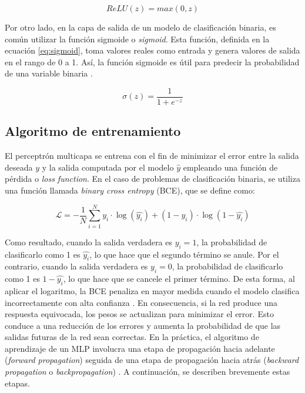 \begin{equation}
	\label{eq:relu}
	ReLU(z) = max(0, z)
\end{equation}

Por otro lado, en la capa de salida de un modelo de clasificación binaria, es común utilizar la función sigmoide o 
\emph{sigmoid}. Esta función, definida en la ecuación \ref{eq:sigmoid}, toma valores reales como entrada y genera 
valores de salida en el rango de 0 a 1. Así, la función sigmoide es útil para predecir la probabilidad de una 
variable binaria \citep{CITE:44}. 

\begin{equation}
	\label{eq:sigmoid}
	\sigma(z) = \frac{1} {1 + e^{-z}}
\end{equation}


\subsection{Algoritmo de entrenamiento}
El perceptrón multicapa se entrena con el fin de minimizar el error entre la salida deseada $y$ y 
la salida computada por el modelo $\hat{y}$ empleando una función de pérdida o \emph{loss function}. 
En el caso de problemas de clasificación binaria, se utiliza una función llamada 
\emph{binary cross entropy} (BCE), que se define como:

\begin{equation}
	\label{eq:BCE}
	\mathcal{L} = -\frac{1}{N} \sum_{i=1}^Ny_{i}\cdot\log(\hat{y_{i}}) + (1 - y_{i})\cdot\log(1 - \hat{y_{i}})
\end{equation}

Como resultado, cuando la salida verdadera es $y_{i} = 1$, la probabilidad de clasificarlo como 
1 es  $\hat{y_{i}}$, lo que hace que el segundo término se anule. Por el contrario, cuando la 
salida verdadera es $y_{i} = 0$, la probabilidad de clasificarlo como 1 es  $1 - \hat{y_{i}}$, 
lo que hace que se cancele el primer término. De esta forma, al aplicar el logaritmo, la BCE 
penaliza en mayor medida cuando el modelo clasifica incorrectamente con alta confianza \citep{CITE:46}. 
En consecuencia, si la red produce una respuesta equivocada, los pesos se actualizan para minimizar el error. 
Esto conduce a una reducción de los errores y aumenta la probabilidad de que las salidas futuras de la red 
sean correctas. En la práctica, el algoritmo de aprendizaje de un MLP involucra una etapa de propagación 
hacia adelante (\emph{forward propagation}) seguida de una etapa de propagación hacia atrás (\emph{backward propagation} 
o \emph{backpropagation}) \citep{CITE:35}. A continuación, se describen brevemente estas etapas.

